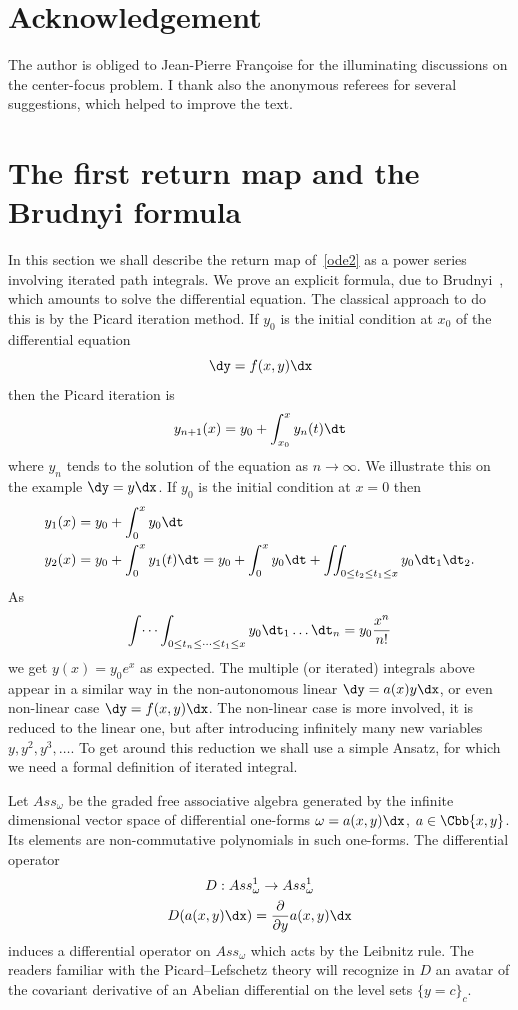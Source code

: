 \section*{Acknowledgement}
The author is obliged to Jean-Pierre Françoise for the illuminating discussions on the center-focus problem. I thank also the anonymous referees for several suggestions, which helped to improve the text.

\section{The first return map and the Brudnyi formula}\label{section2}
In this section we shall describe the return map of~\eqref{ode2} as a power series involving iterated path integrals. We prove an explicit formula, due to Brudnyi~\cite{brud06}, which amounts to solve the differential equation. The classical approach to do this is by the Picard iteration method. If $y_0$ is the initial condition at $x_0$ of the differential equation
\[
\dy = f(x,y) \dx
\]
then the Picard iteration is
\[
y_{n+1}(x) = y_0 + \int_{x_0}^x y_n(t) \dt
\]
where $y_n$ tends to the solution of the equation as $n\to \infty$. We illustrate this on the example $\dy = y \dx$. If $y_0$ is the initial condition at $x = 0$ then
\begin{align*}\label{exp}
y_1(x) & = y_0 + \int_0^x y_0 \dt\\
y_2(x) & = y_0 + \int_0^x y_1(t) \dt = y_0 + \int_0^x y_0 \dt + \iint_{0\leq t_2\leq t_1\leq x} y_0 \dt_1 \dt_2.
\end{align*}
As
\[
\int \dots \int_{0 \leq t_n\leq \dots \leq t_1\leq x}y_0 \dt_1 \dots \dt_n = y_0 \frac{x^n}{n!}
\]
we get $y(x) = y_0 e^x$ as expected. The multiple (or iterated) integrals above appear in a similar way in the non-autonomous linear $\dy=a(x) y \dx$, or even non-linear case $\dy=f(x,y) \dx$. The non-linear case is more involved, it is reduced to the linear one, but after introducing infinitely many new variables $y, y^2, y^3, \dots $. To get around this reduction we shall use a simple Ansatz, for which we need a formal definition of iterated integral.



Let $Ass_\omega$ be the graded free associative algebra generated by the infinite dimensional vector space of differential one-forms $\omega = a(x,y) \dx$, $a \in \Cbb\{x,y\}$. Its elements are non-commutative polynomials in such one-forms. The differential operator
\begin{gather*}
D : Ass^1_\omega \to Ass^1_\omega
\\
D(a(x,y) \dx) = \frac{\partial}{\partial y} a(x,y) \dx
\end{gather*}
induces a differential operator on $ Ass_\omega$ which acts by the Leibnitz rule. The readers familiar with the Picard--Lefschetz theory will recognize in $D$ an avatar of the covariant derivative of an Abelian differential on the level sets $\{y=c \}_c$.

